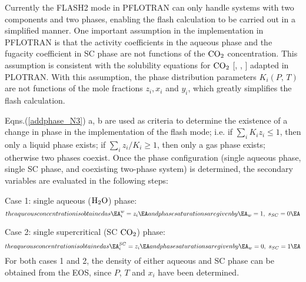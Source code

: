 \documentclass[12pt]{article}
\def\BA#1\EA{\begin{align}#1\end{align}}
\renewcommand{\c}{{\rm CO_2}}
\newcommand{\w}{{\rm H_2O}}
\begin{document}
Currently the FLASH2 mode in PFLOTRAN can only handle systems with two components and two phases, enabling the flash calculation to be carried out in a simplified manner. One important assumption in the implementation in PFLOTRAN is that the activity coefficients in the aqueous phase and the fugacity coefficient in SC phase are not functions of the $\c$ concentration. 
This assumption is consistent with the solubility equations for $\c$ [\cite {garcia01}, \cite{duan2003}, \cite{duan2008}] adapted in PLOTRAN. With this assumption, the phase distribution parameters $K_i(P,\,T)$ are not functions of the mole fractions $z_i, x_i$ and $y_i$, which greatly simplifies the flash calculation. 

Eqns.(\ref{addphase_N3}) a, b are used as criteria to determine the existence of a change in phase in the implementation of the flash mode; i.e. if $\sum_i K_i z_i \leq 1$, then only a liquid phase exists; if $\sum_i {z_i}/{K_i} \geq 1$, then only a gas phase exists; otherwise two phases coexist. Once the phase configuration (single aqueous phase, single SC phase, and coexisting two-phase system) is determined, the secondary variables are evaluated in the following steps: 

\noindent
Case 1: single aqueous ($\w$) phase:
\begin{subequations}\label{fla-sec-c1}
the aqueous concentration is obtained as
\BA
 x_i^w = z_i
\EA
and phase saturations are given by
\BA
 s_w = 1, \ s_{SC} =0 
\EA
\end{subequations}

\noindent
Case 2: single supercritical (SC $\c$) phase:
\begin{subequations}\label{fla-sec-c2}
the aqueous concentration is obtained as
\BA
 x_i^{SC} = z_i
\EA
and phase saturations are given by
\BA
 s_w = 0, \ s_{SC} =1 
\EA
\end{subequations}
For both cases 1 and 2, the density of either aqueous and SC phase can be obtained from the EOS, since $P$, $T$ and $x_i$ have been determined.
\end{document}
